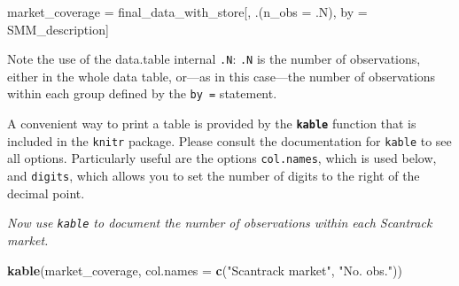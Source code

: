 \documentclass[
]{article}
\newenvironment{Shaded}{\begin{snugshade}}{\end{snugshade}}
\newcommand{\AttributeTok}[1]{\textcolor[rgb]{0.13,0.29,0.53}{#1}}
\newcommand{\FunctionTok}[1]{\textcolor[rgb]{0.13,0.29,0.53}{\textbf{#1}}}
\newcommand{\NormalTok}[1]{#1}
\newcommand{\OtherTok}[1]{\textcolor[rgb]{0.56,0.35,0.01}{#1}}
\newcommand{\StringTok}[1]{\textcolor[rgb]{0.31,0.60,0.02}{#1}}
\begin{document}
\begin{Shaded}
\begin{Highlighting}[]
\NormalTok{market\_coverage }\OtherTok{=}\NormalTok{ final\_data\_with\_store[, .(}\AttributeTok{n\_obs =}\NormalTok{ .N), by }\OtherTok{=}\NormalTok{ SMM\_description]}
\end{Highlighting}
\end{Shaded}

Note the use of the data.table internal \texttt{.N}: \texttt{.N} is the
number of observations, either in the whole data table, or---as in this
case---the number of observations within each group defined by the
\texttt{by\ =} statement.

\medskip

A convenient way to print a table is provided by the
\textbf{\texttt{kable}} function that is included in the \texttt{knitr}
package. Please consult the documentation for \texttt{kable} to see all
options. Particularly useful are the options \texttt{col.names}, which
is used below, and \texttt{digits}, which allows you to set the number
of digits to the right of the decimal point.

\emph{Now use \texttt{kable} to document the number of observations
within each Scantrack market.}

\begin{Shaded}
\begin{Highlighting}[]
\FunctionTok{kable}\NormalTok{(market\_coverage, }\AttributeTok{col.names =} \FunctionTok{c}\NormalTok{(}\StringTok{"Scantrack market"}\NormalTok{, }\StringTok{"No. obs."}\NormalTok{))}
\end{Highlighting}
\end{Shaded}
\end{document}

